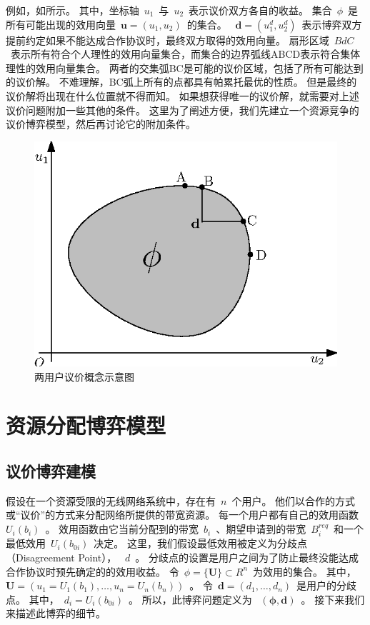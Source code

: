 例如，如所示。
其中，坐标轴~$u_1$~与~$u_2$~表示议价双方各自的收益。
集合~$\phi$~是所有可能出现的效用向量~$\mathbf{u}=(u_1,u_2)$~的集合。
~$\mathbf{d}=(u_1^d, u_2^d)$~表示博弈双方提前约定如果不能达成合作协议时，最终双方取得的效用向量。
扇形区域~$BdC$~表示所有符合个人理性的效用向量集合，而集合的边界弧线ABCD表示符合集体理性的效用向量集合。
两者的交集弧BC是可能的议价区域，包括了所有可能达到的议价解。
不难理解，BC弧上所有的点都具有帕累托最优的性质。
但是最终的议价解将出现在什么位置就不得而知。
如果想获得唯一的议价解，就需要对上述议价问题附加一些其他的条件。
这里为了阐述方便，我们先建立一个资源竞争的议价博弈模型，然后再讨论它的附加条件。
\begin{figure}[!tb] 
    \centering
   \begin{minipage}[t]{0.65\linewidth} 
    \centering 
    \includegraphics[width = \textwidth]{bargain_basic_concept} 
    \caption{两用户议价概念示意图} 
    \label{fig:chap_bargain:bargain_basic_concept} 
  \end{minipage}%
\end{figure}


\section{资源分配博弈模型}
\subsection{议价博弈建模}
假设在一个资源受限的无线网络系统中，存在有~$n$~个用户。
他们以合作的方式或“议价”的方式来分配网络所提供的带宽资源。
每一个用户都有自己的效用函数~$U_i(b_i)$~。
效用函数由它当前分配到的带宽~$b_i$~、期望申请到的带宽~$B_i^{req}$~和一个最低效用~$U_i(b_{0i})$~决定。
这里，我们假设最低效用被定义为分歧点（Disagreement Point）， ~$d$~。 
分歧点的设置是用户之间为了防止最终没能达成合作协议时预先确定的的效用收益。
令~$\phi = \{ \mathbf{U} \} \subset R^n$~为效用的集合。
其中，~$\mathbf{U} =( u_1 =U_1(b_1), \ldots, u_n = U_n(b_n))$~。
令~$\mathbf{d} = (d_1, \ldots, d_n)$~是用户的分歧点。
其中，~$d_i = U_i(b_{0i})$~。
所以，此博弈问题定义为 ~$(\mathbf{\phi,d})$~。
接下来我们来描述此博弈的细节。

